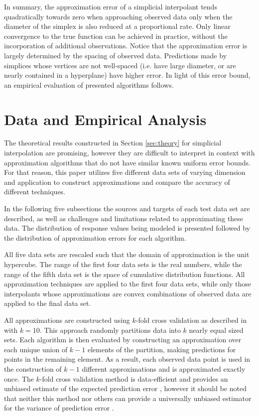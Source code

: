 \documentclass[smallextended,final]{svjour3}       %
\begin{document}
In summary, the approximation error of a simplicial interpolant tends
quadratically towards zero when approaching observed data only when
the diameter of the simplex is also reduced at a proportional rate.
Only linear convergence to the true function can be achieved in
practice, without the incorporation of additional observations. Notice
that the approximation error is largely determined by the spacing of
observed data. Predictions made by simplices whose vertices are not
well-spaced (i.e. have large diameter, or are nearly contained in a
hyperplane) have higher error. In light of this error bound, an
empirical evaluation of presented algorithms follows.

\section{Data and Empirical Analysis}
\label{sec:data}

The theoretical results constructed in Section \ref{sec:theory} for
simplicial interpolation are promising, however they are difficult to
interpret in context with approximation algorithms that do not have
similar known uniform error bounds. For that reason, this paper
utilizes five different data sets of varying dimension and application
to construct approximations and compare the accuracy of different
techniques.

In the following five subsections the sources and targets of each test
data set are described, as well as challenges and limitations related
to approximating these data. The distribution of response values being
modeled is presented followed by the distribution of approximation
errors for each algorithm.

All five data sets are rescaled such that the domain of approximation
is the unit hypercube. The range of the first four data sets is the
real numbers, while the range of the fifth data set is the space of
cumulative distribution functions. All approximation techniques are
applied to the first four data sets, while only those interpolants
whose approximations are convex combinations of observed data are
applied to the final data set.

All approximations are constructed using $k$-fold cross validation as
described in \cite{kohavi1995study} with $k=10$. This approach
randomly partitions data into $k$ nearly equal sized sets. Each
algorithm is then evaluated by constructing an approximation over each
unique union of $k-1$ elements of the partition, making predictions
for points in the remaining element. As a result, each observed data
point is used in the construction of $k-1$ different approximations
and is approximated exactly once. The $k$-fold cross validation method
is data-efficient and provides an unbiased estimate of the expected
prediction error \cite{kohavi1995study}, however it should be noted
that neither this method nor others can provide a universally unbiased
estimator for the variance of prediction error \cite{bengio2004no}.
\end{document}
